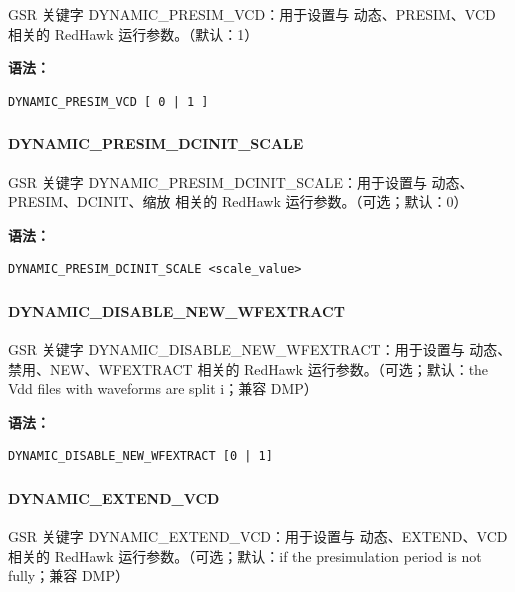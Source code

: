 GSR 关键字 DYNAMIC_PRESIM_VCD：用于设置与 动态、PRESIM、VCD 相关的 RedHawk 运行参数。（默认：1）

\textbf{语法：}
\begin{lstlisting}
DYNAMIC_PRESIM_VCD [ 0 | 1 ]
\end{lstlisting}

\subsubsection{}
\paragraph*{DYNAMIC_PRESIM_DCINIT_SCALE}

GSR 关键字 DYNAMIC_PRESIM_DCINIT_SCALE：用于设置与 动态、PRESIM、DCINIT、缩放 相关的 RedHawk 运行参数。（可选；默认：0）

\textbf{语法：}
\begin{lstlisting}
DYNAMIC_PRESIM_DCINIT_SCALE <scale_value>
\end{lstlisting}

\subsubsection{}
\paragraph*{DYNAMIC_DISABLE_NEW_WFEXTRACT}

GSR 关键字 DYNAMIC_DISABLE_NEW_WFEXTRACT：用于设置与 动态、禁用、NEW、WFEXTRACT 相关的 RedHawk 运行参数。（可选；默认：the Vdd files with waveforms are split i；兼容 DMP）

\textbf{语法：}
\begin{lstlisting}
DYNAMIC_DISABLE_NEW_WFEXTRACT [0 | 1]
\end{lstlisting}

\subsubsection{}
\paragraph*{DYNAMIC_EXTEND_VCD}

GSR 关键字 DYNAMIC_EXTEND_VCD：用于设置与 动态、EXTEND、VCD 相关的 RedHawk 运行参数。（可选；默认：if the presimulation period is not fully；兼容 DMP）

